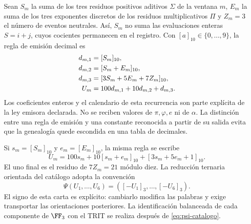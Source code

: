 Sean \(S_m\) la suma de los tres residuos positivos aditivos \(\Sigma\) de la ventana \(m\), \(E_m\) la suma de los tres exponentes discretos de los residuos multiplicativos \(\Pi\) y \(Z_m=3\) el número de eventos neutrales. Así, \(S_m\) no suma las evaluaciones enteras \(S=i+j\), cuyos cocientes permanecen en el registro. Con \([a]_{10}\in\{0,\ldots,9\}\), la regla de emisión decimal es
\begin{align}
 d_{m,1}&=[S_m]_{10},\notag\\
 d_{m,2}&=[S_m+E_m]_{10},\notag\\
 d_{m,3}&=[3S_m+5E_m+7Z_m]_{10},\notag\\
 U_m&=100d_{m,1}+10d_{m,2}+d_{m,3}.
 \label{eq:emisor-seis}
\end{align}
Los coeficientes enteros y el calendario de esta recurrencia son parte explícita de la ley emisora declarada. No se reciben valores de \(\pi,\varphi,e\) ni de \(\alpha\). La distinción entre una regla de emisión y una constante reconocida a partir de su salida evita que la genealogía quede escondida en una tabla de decimales.

Si \(s_m=[S_m]_{10}\) y \(e_m=[E_m]_{10}\), la misma regla se escribe
\begin{equation}
 U_m=100s_m+10[s_m+e_m]_{10}+[3s_m+5e_m+1]_{10}.
 \label{eq:acoplamiento}
\end{equation}
El uno final es el residuo de \(7Z_m=21\) módulo diez. La reducción ternaria orientada del catálogo adopta la convención
\begin{equation}
 \Psi(U_1,\ldots,U_6)=([-U_1]_3,\ldots,[-U_6]_3).
 \label{eq:psi-catalogo}
\end{equation}
El signo de esta carta es explícito: cambiarlo modifica las palabras y exige transportar las orientaciones posteriores. La identificación balanceada de cada componente de \(\FF_3\) con el TRIT se realiza después de \eqref{eq:psi-catalogo}.

